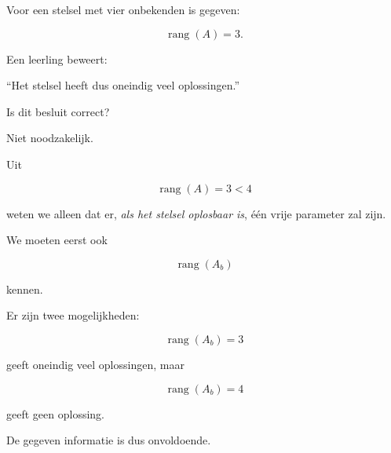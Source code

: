 \documentclass{ximera}
\begin{document}

\begin{oefening}{\oefU}

Voor een stelsel met vier onbekenden is gegeven:

\[
\operatorname{rang}(A)=3.
\]

Een leerling beweert:

\begin{center}
``Het stelsel heeft dus oneindig veel oplossingen.''
\end{center}

Is dit besluit correct?

\begin{oplossing}

Niet noodzakelijk.

Uit

\[
\operatorname{rang}(A)=3<4
\]

weten we alleen dat er, \emph{als het stelsel oplosbaar is},
één vrije parameter zal zijn.

We moeten eerst ook

\[
\operatorname{rang}(A_b)
\]

kennen.

Er zijn twee mogelijkheden:

\[
\operatorname{rang}(A_b)=3
\]

geeft oneindig veel oplossingen, maar

\[
\operatorname{rang}(A_b)=4
\]

geeft geen oplossing.

De gegeven informatie is dus onvoldoende.

\end{oplossing}

\end{oefening}






\end{document}
